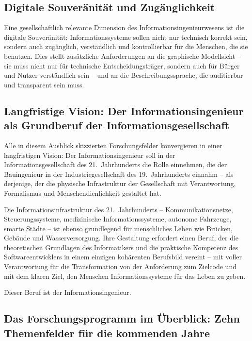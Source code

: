 ﻿\documentclass[a4paper,12pt]{report}
\theoremstyle{definition}
\begin{document}
\subsection{Digitale Souveränität und Zugänglichkeit}

Eine gesellschaftlich relevante Dimension des Informationsingenieurwesens ist die
digitale Souveränität: Informationssysteme sollen nicht nur technisch korrekt sein,
sondern auch zugänglich, verständlich und kontrollierbar für die Menschen, die sie
benutzen. Dies stellt zusätzliche Anforderungen an die graphische Modellsicht --
sie muss nicht nur für technische Entscheidungsträger, sondern auch für Bürger und
Nutzer verständlich sein -- und an die Beschreibungssprache, die auditierbar und
transparent sein muss.

\subsection{Langfristige Vision: Der Informationsingenieur als Grundberuf der Informationsgesellschaft}

Alle in diesem Ausblick skizzierten Forschungsfelder konvergieren in einer
langfristigen Vision: Der Informationsingenieur soll in der Informationsgesellschaft
des 21.~Jahrhunderts die Rolle einnehmen, die der Bauingenieur in der Industriegesellschaft
des 19.~Jahrhunderts einnahm -- als derjenige, der die physische Infrastruktur der
Gesellschaft mit Verantwortung, Formalismus und Menschendienlichkeit gestaltet hat.

Die Informationsinfrastruktur des 21.~Jahrhunderts -- Kommunikationsnetze, Steuerungssysteme,
medizinische Informationssysteme, autonome Fahrzeuge, smarte Städte -- ist ebenso
grundlegend für menschliches Leben wie Brücken, Gebäude und Wasserversorgung.
Ihre Gestaltung erfordert einen Beruf, der die theoretischen Grundlagen des Informatikers
und die praktische Kompetenz des Softwareentwicklers in einem einzigen kohärenten
Berufsbild vereint -- mit voller Verantwortung für die Transformation von der
Anforderung zum Zielcode und mit dem klaren Ziel, den Menschen Informationssysteme
für das Leben zu geben.

Dieser Beruf ist der Informationsingenieur.

\subsection{Das Forschungsprogramm im Überblick: Zehn Themenfelder für die kommenden Jahre}
\label{sec:forschungsprogramm}
\end{document}
